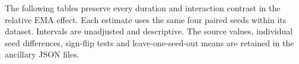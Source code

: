The following tables preserve every duration and interaction contrast in
the relative EMA effect. Each estimate uses the same four paired seeds
within its dataset. Intervals are unadjusted and descriptive. The source
values, individual seed differences, sign-flip tests and leave-one-seed-out
means are retained in the ancillary JSON files.

